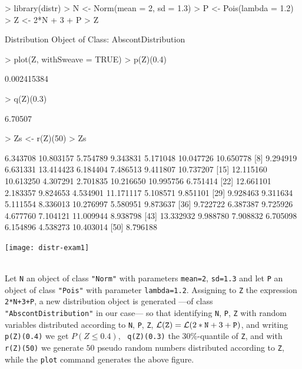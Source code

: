 \documentclass[11pt]{article}
\newcommand{\code}[1]{{\tt #1}}
\begin{document}
\begin{Schunk}
\begin{Sinput}
> library(distr)
> N <- Norm(mean = 2, sd = 1.3)
> P <- Pois(lambda = 1.2)
> Z <- 2*N + 3 + P
> Z
\end{Sinput}
\begin{Soutput}
Distribution Object of Class: AbscontDistribution
\end{Soutput}
\begin{Sinput}
> plot(Z, withSweave = TRUE)
> p(Z)(0.4)
\end{Sinput}
\begin{Soutput}
[1] 0.002415384
\end{Soutput}
\begin{Sinput}
> q(Z)(0.3)
\end{Sinput}
\begin{Soutput}
[1] 6.70507
\end{Soutput}
\begin{Sinput}
> Zs <- r(Z)(50)
> Zs
\end{Sinput}
\begin{Soutput}
 [1]  6.343708 10.803157  5.754789  9.343831  5.171048 10.047726 10.650778
 [8]  9.294919  6.631331 13.414423  6.184404  7.486513  9.411807 10.737207
[15] 12.115160 10.613250  4.307291  2.701835 10.216650 10.995756  6.751414
[22] 12.661101  2.183357  9.824653  4.534901 11.171117  5.108571  9.851101
[29]  9.928463  9.311634  5.111554  8.336013 10.276997  5.580951  9.873637
[36]  9.722722  6.387387  9.725926  4.677760  7.104121 11.009944  8.938798
[43] 13.332932  9.988780  7.908832  6.705098  6.154896  4.538273 10.403014
[50]  8.796188
\end{Soutput}
\end{Schunk}
\texttt{[image: distr-exam1]}
\par
\begin{small}
\\
Let \code{N} an object of class \code{"Norm"} with parameters  \code{mean=2},
\code{sd=1.3} and let \code{P}  an object of class \code{"Pois"} with parameter
\code{lambda=1.2}. Assigning to \code{Z} the expression \code{2*N+3+P}, a
new distribution object is generated ---of class \code{"AbscontDistribution"} in
our case--- so that identifying \code{N}, \code{P}, \code{Z} with random
variables distributed according to {\tt N}, {\tt P}, {\tt Z},
${\cal L}({\tt Z})={\cal L}(2*{\tt N}+3+{\tt P})$,  and writing \code{p(Z)(0.4)}
we get $P(Z\leq 0.4)$, \code{ q(Z)(0.3)}  the $30\%$-quantile of {\tt Z},
and with \code{r(Z)(50)} we generate $50$ pseudo random numbers distributed
according to {\tt Z}, while the \code{plot} command generates the above figure.
\end{small}
\end{document}
